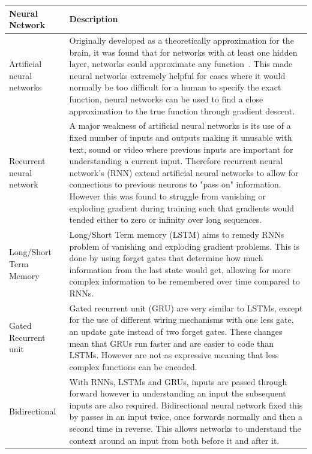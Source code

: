 \begin{longtable}{|p{3.5cm}|p{10cm}|} \hline
    \textbf{Neural Network} & \textbf{Description} \\ \hline
    Artificial neural networks \citep{ANN} & Originally developed as a theoretically approximation for the brain, it
        was found that for networks with at least one hidden layer, networks could approximate any
        function~\citep{csaji2001approximation}. This made neural networks extremely helpful for cases where it would
        normally be too difficult for a human to specify the exact function, neural networks can be used to find a
        close approximation to the true function through gradient descent. \\ \hline

    Recurrent neural network~\citep{RNN} & A major weakness of artificial neural networks is its use of a fixed
        number of inputs and outputs making it unusable with text, sound or video where previous inputs are important
        for understanding a current input. Therefore recurrent neural network's (RNN) extend artificial neural networks
        to allow for connections to previous neurons to "pass on" information. However this was found to struggle from
        vanishing or exploding gradient during training such that gradients would tended either to zero or infinity
        over long sequences. \\ \hline

    Long/Short Term Memory \citep{LSTM} & Long/Short Term memory (LSTM) aims to remedy RNNs problem of vanishing and
        exploding gradient problems. This is done by using forget gates that determine how much information from the
        last state would get, allowing for more complex information to be remembered over time compared to RNNs. \\ \hline

    Gated Recurrent unit~\citep{GRU} & Gated recurrent unit (GRU) are very similar to LSTMs, except for the use of
        different wiring mechanisms with one less gate, an update gate instead of two forget gates. These changes mean
        that GRUs run faster and are easier to code than LSTMs. However are not as expressive meaning that less complex
        functions can be encoded. \\ \hline

    Bidirectional \citep{Bidirectional} & With RNNs, LSTMs and GRUs, inputs are passed through forward however in
        understanding an input the subsequent inputs are also required. Bidirectional neural network fixed this by
        passes in an input twice, once forwards normally and then a second time in reverse. This allows networks to
        understand the context around an input from both before it and after it. \\ \hline


\end{longtable}
